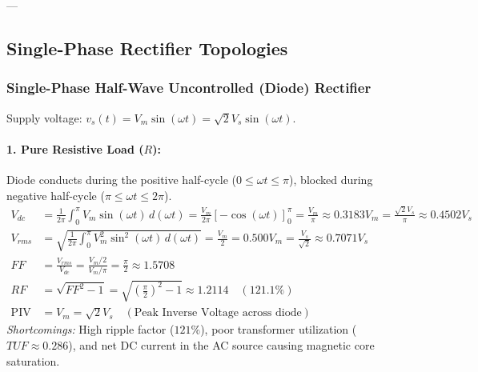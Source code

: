 ---

\subsection{Single-Phase Rectifier Topologies}

\subsubsection{Single-Phase Half-Wave Uncontrolled (Diode) Rectifier}
Supply voltage: $v_s(t) = V_m \sin(\omega t) = \sqrt{2} V_s \sin(\omega t)$.

\paragraph{1. Pure Resistive Load ($R$):}
Diode conducts during the positive half-cycle ($0 \le \omega t \le \pi$), blocked during negative half-cycle ($\pi \le \omega t \le 2\pi$).
\begin{align}
V_{dc} &= \frac{1}{2\pi}\int_0^\pi V_m \sin(\omega t)\,d(\omega t) = \frac{V_m}{2\pi}\left[-\cos(\omega t)\right]_0^\pi = \frac{V_m}{\pi} \approx 0.3183 V_m = \frac{\sqrt{2} V_s}{\pi} \approx 0.4502 V_s \\
V_{rms} &= \sqrt{\frac{1}{2\pi}\int_0^\pi V_m^2 \sin^2(\omega t)\,d(\omega t)} = \frac{V_m}{2} = 0.500 V_m = \frac{V_s}{\sqrt{2}} \approx 0.7071 V_s \\
FF &= \frac{V_{rms}}{V_{dc}} = \frac{V_m/2}{V_m/\pi} = \frac{\pi}{2} \approx 1.5708 \\
RF &= \sqrt{FF^2 - 1} = \sqrt{\left(\frac{\pi}{2}\right)^2 - 1} \approx 1.2114 \quad (121.1\%) \\
\text{PIV} &= V_m = \sqrt{2} V_s \quad (\text{Peak Inverse Voltage across diode})
\end{align}
\textit{Shortcomings:} High ripple factor ($121\%$), poor transformer utilization ($TUF \approx 0.286$), and net DC current in the AC source causing magnetic core saturation.

